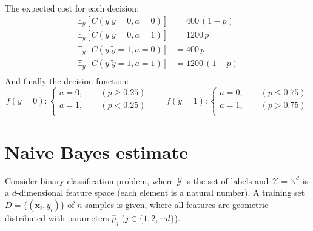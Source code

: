 \documentclass[a4paper, 10pt]{article}
\begin{document}
\begin{enumerate}[label=(\alph*)]
    The expected cost for each decision:
    \begin{equation}
        \begin{aligned}
            \mathbb{E}_y[C(y|\widetilde{y}=0, a=0)] &= 400 \, (1-p) \\ 
            \mathbb{E}_y[C(y|\widetilde{y}=0, a=1)] &= 1200 \, p \\ 
            \mathbb{E}_y[C(y|\widetilde{y}=1, a=0)] &= 400 \, p \\ 
            \mathbb{E}_y[C(y|\widetilde{y}=1, a=1)] &= 1200 \, (1-p) \\ 
        \end{aligned}
    \end{equation}
    And finally the decision function:
    \begin{equation}
        f(\widetilde{y}=0) : \left\{\begin{aligned}
            a = 0, \qquad (p \geq 0.25) \\ 
            a = 1, \qquad (p < 0.25) \\ 
        \end{aligned}\right.\qquad
        f(\widetilde{y}=1) : \left\{\begin{aligned}
            a = 0, \qquad (p \leq 0.75) \\ 
            a = 1, \qquad (p > 0.75) \\ 
        \end{aligned}\right.
    \end{equation}
\end{enumerate}

\section{Naive Bayes estimate}

Consider binary classification problem, where $\mathcal{Y}$ is the set of labels and $\mathcal{X} = \mathbb{N}^d$ is a $d$-dimensional feature space (each element is a natural number). A training set $D = \{(\mathbf{x}_i, y_i)\}$ of $n$ samples is given, where all features are geometric distributed with parameters $\hat{p}_j$ ($j\in \{1, 2, \cdots d\}$).
\end{document}
